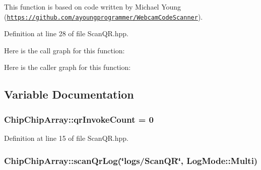 This function is based on code written by Michael Young (\href{https://github.com/ayoungprogrammer/WebcamCodeScanner}{\tt https\+://github.\+com/ayoungprogrammer/\+Webcam\+Code\+Scanner}). 

Definition at line 28 of file Scan\+Q\+R.\+hpp.



Here is the call graph for this function\+:




Here is the caller graph for this function\+:




\subsection{Variable Documentation}
\hypertarget{namespaceChipChipArray_a3b2a3c0ffa9f53021293aeb4955d2fef}{
\subsubsection[{qr\+Invoke\+Count}]{ Chip\+Chip\+Array\+::qr\+Invoke\+Count = 0}}\label{namespaceChipChipArray_a3b2a3c0ffa9f53021293aeb4955d2fef}


Definition at line 15 of file Scan\+Q\+R.\+hpp.

\hypertarget{namespaceChipChipArray_ab5c6290951637c25a5422707020fb3a8}{
\subsubsection[{scan\+Qr\+Log}]{ Chip\+Chip\+Array\+::scan\+Qr\+Log(\char`\"{}logs/{\bf Scan\+Q\+R}\char`\"{}, Log\+Mode\+::\+Multi)}}\label{namespaceChipChipArray_ab5c6290951637c25a5422707020fb3a8}
